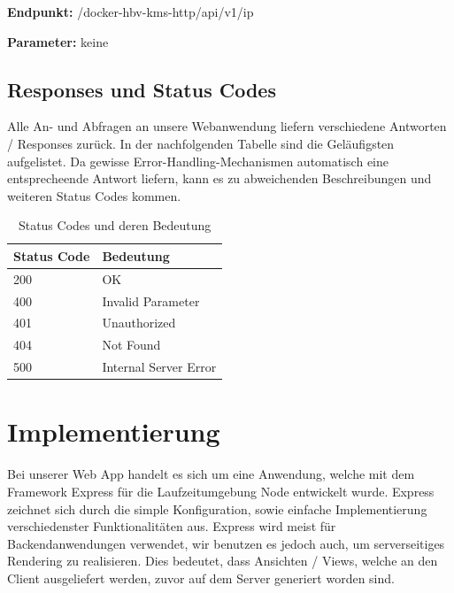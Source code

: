 \textbf{Endpunkt:} /docker-hbv-kms-http/api/v1/ip

\textbf{Parameter:} keine

\dotfill


\subsection{Responses und Status Codes}
\label{sec:nodechapter-implementation-responses}
Alle An- und Abfragen an unsere Webanwendung liefern verschiedene Antworten / Responses zurück. In der nachfolgenden Tabelle sind die Geläufigsten aufgelistet. Da gewisse Error-Handling-Mechanismen automatisch eine entsprecheende Antwort liefern, kann es zu abweichenden Beschreibungen und weiteren Status Codes kommen.
\begin{table}[H]
    \caption{Status Codes und deren Bedeutung }
    \label{tab:responsecodes}
    \setlength{\tabcolsep}{3pt}
    \begin{tabular}{p{100pt}p{280pt}}
        Status Code & Bedeutung             \\
        \midrule
        200         & OK                    \\
        400         & Invalid Parameter     \\
        401         & Unauthorized          \\
        404         & Not Found             \\
        500         & Internal Server Error \\
        \bottomrule
    \end{tabular}
\end{table}


\newpage
\section{Implementierung}
\label{sec:nodechapter-implementation}
Bei unserer Web App handelt es sich um eine Anwendung, welche mit dem Framework Express für die Laufzeitumgebung Node entwickelt wurde. Express zeichnet sich durch die simple Konfiguration, sowie einfache Implementierung verschiedenster Funktionalitäten aus. Express wird meist für Backendanwendungen verwendet, wir benutzen es jedoch auch, um serverseitiges Rendering zu realisieren. Dies bedeutet, dass Ansichten / Views, welche an den Client ausgeliefert werden, zuvor auf dem Server generiert worden sind.\\

